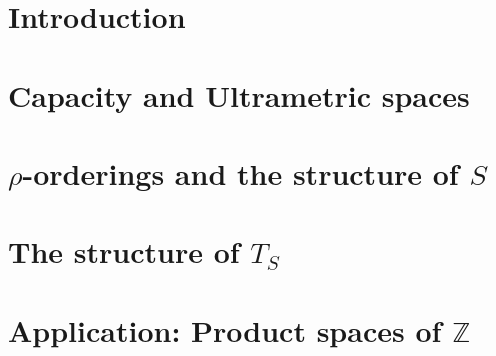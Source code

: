\documentclass[12pt, glossary]{dalthesis}
\theoremstyle{plain}
\theoremstyle{definition}
\begin{document}
\chapter{Introduction}

\chapter{Capacity and Ultrametric spaces}

\chapter{$\rho$-orderings and the structure of $S$}

\chapter{The structure of $T_S$}

\chapter{Application: Product spaces of $\mathbb{Z}$}

%
%
%
\end{document}
